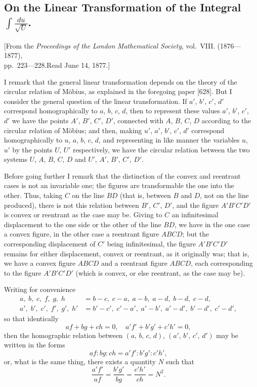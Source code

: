 \documentclass[11pt,a4paper]{book}
\begin{document}
\subsection*{On the Linear Transformation of the Integral $\displaystyle\int\!\frac{du}{\surd U}$.}

\begin{center}
\small
[From the \textit{Proceedings of the London Mathematical Society}, vol.~VIII. (1876---1877),\\
pp.~223---228.\quad Read June 14, 1877.]
\end{center}

\medskip
\noindent
I remark that the general linear transformation depends on the theory of the circular relation of M\"obius, as explained in the foregoing paper [628]. But I consider the general question of the linear transformation. If $a'$, $b'$, $c'$, $d'$ correspond homographically to $a$, $b$, $c$, $d$, then to represent these values $a'$, $b'$, $c'$, $d'$ we have the points $A'$, $B'$, $C'$, $D'$, connected with $A$, $B$, $C$, $D$ according to the circular relation of M\"obius; and then, making $u'$, $a'$, $b'$, $c'$, $d'$ correspond homographically to $u$, $a$, $b$, $c$, $d$, and representing in like manner the variables $u$, $u'$ by the points $U$, $U'$ respectively, we have the circular relation between the two systems $U$, $A$, $B$, $C$, $D$ and $U'$, $A'$, $B'$, $C'$, $D'$.

Before going further I remark that the distinction of the convex and reentrant cases is not an invariable one; the figures are transformable the one into the other. Thus, taking $C$ on the line $BD$ (that is, between $B$ and $D$, not on the line produced), there is not this relation between $B'$, $C'$, $D'$, and the figure $A'B'C'D'$ is convex or reentrant as the case may be. Giving to $C$ an infinitesimal displacement to the one side or the other of the line $BD$, we have in the one case a convex figure, in the other case a reentrant figure $ABCD$; but the corresponding displacement of $C'$ being infinitesimal, the figure $A'B'C'D'$ remains for either displacement, convex or reentrant, as it originally was; that is, we have a convex figure $ABCD$ and a reentrant figure $ABCD$, each corresponding to the figure $A'B'C'D'$ (which is convex, or else reentrant, as the case may be).

Writing for convenience
\begin{align*}
a,\; b,\; c,\; f,\; g,\; h &= b-c,\; c-a,\; a-b,\; a-d,\; b-d,\; c-d, \\
a',\; b',\; c',\; f',\; g',\; h' &= b'-c',\; c'-a',\; a'-b',\; a'-d',\; b'-d',\; c'-d',
\end{align*}
so that identically
\[
af + bg + ch = 0, \quad a'f' + b'g' + c'h' = 0,
\]
then the homographic relation between $(a,\,b,\,c,\,d)$, $(a',\,b',\,c',\,d')$ may be written in the forms
\[
af : bg : ch = a'f' : b'g' : c'h',
\]
or, what is the same thing, there exists a quantity $N$ such that
\[
\frac{a'f'}{af} = \frac{b'g'}{bg} = \frac{c'h'}{ch} = N^2.
\]
\end{document}
